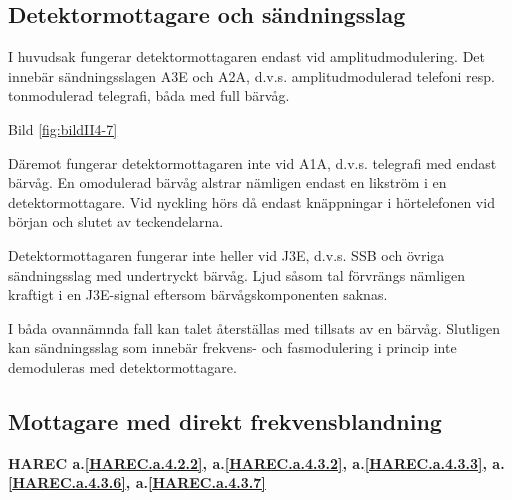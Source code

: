 \subsection{Detektormottagare och sändningsslag}

I huvudsak fungerar detektormottagaren endast vid
amplitudmodulering. Det innebär sändningsslagen A3E och A2A,
d.v.s. amplitudmodulerad telefoni resp. tonmodulerad telegrafi, båda
med full bärvåg.

Bild \ref{fig:bildII4-7}

Däremot fungerar detektormottagaren inte vid A1A, d.v.s. telegrafi med
endast bärvåg. En omodulerad bärvåg alstrar nämligen endast en
likström i en detektormottagare. Vid nyckling hörs då endast
knäppningar i hörtelefonen vid början och slutet av teckendelarna.

Detektormottagaren fungerar inte heller vid J3E, d.v.s. SSB och övriga
sändningsslag med undertryckt bärvåg. Ljud såsom tal förvrängs
nämligen kraftigt i en J3E-signal eftersom bärvågskomponenten saknas.

I båda ovannämnda fall kan talet återställas med tillsats av en bärvåg.
Slutligen kan sändningsslag som innebär frekvens- och fasmodulering i
princip inte demoduleras med detektormottagare.

\subsection{Mottagare med direkt frekvensblandning}
\textbf{HAREC a.\ref{HAREC.a.4.2.2}\label{myHAREC.a.4.2.2},
a.\ref{HAREC.a.4.3.2}\label{myHAREC.a.4.3.2},
a.\ref{HAREC.a.4.3.3}\label{myHAREC.a.4.3.3},
a.\ref{HAREC.a.4.3.6}\label{myHAREC.a.4.3.6},
a.\ref{HAREC.a.4.3.7}\label{myHAREC.a.4.3.7}
}

